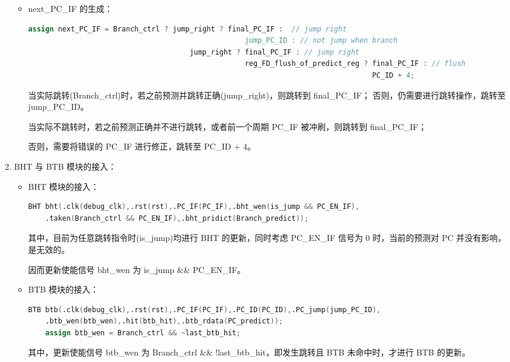 \documentclass{article}
\begin{document}
\begin{enumerate}
\begin{itemize}
        \item next\_PC\_IF 的生成：\par
        \begin{lstlisting}[language=Verilog]
    assign next_PC_IF = Branch_ctrl ? jump_right ? final_PC_IF :  // jump right
                                                   jump_PC_ID : // not jump when branch
                                      jump_right ? final_PC_IF : // jump right
                                                   reg_FD_flush_of_predict_reg ? final_PC_IF : // flush
                                                                                 PC_ID + 4;
        \end{lstlisting}
        当实际跳转(Branch\_ctrl)时，若之前预测并跳转正确(jump\_right)，则跳转到 final\_PC\_IF；
        否则，仍需要进行跳转操作，跳转至 jump\_PC\_ID。\par
        当实际不跳转时，若之前预测正确并不进行跳转，或者前一个周期 PC\_IF 被冲刷，则跳转到 final\_PC\_IF；\par
        否则，需要将错误的 PC\_IF 进行修正，跳转至 PC\_ID + 4。\par
    \end{itemize}

    \item BHT 与 BTB 模块的接入：\par
    \begin{itemize}
        \item BHT 模块的接入：\par
        \begin{lstlisting}[language=Verilog]
        BHT bht(.clk(debug_clk),.rst(rst),.PC_IF(PC_IF),.bht_wen(is_jump && PC_EN_IF),
    .taken(Branch_ctrl && PC_EN_IF),.bht_pridict(Branch_predict));
        \end{lstlisting}
        其中，目前为任意跳转指令时(is\_jump)均进行 BHT 的更新，同时考虑 PC\_EN\_IF 信号为 0 时，当前的预测对 PC 并没有影响，是无效的。\par
        因而更新使能信号 bht\_wen 为 is\_jump \&\& PC\_EN\_IF。\par

        \item BTB 模块的接入：\par
        \begin{lstlisting}[language=Verilog]
        BTB btb(.clk(debug_clk),.rst(rst),.PC_IF(PC_IF),.PC_ID(PC_ID),.PC_jump(jump_PC_ID),
    .btb_wen(btb_wen),.hit(btb_hit),.btb_rdata(PC_predict));
    assign btb_wen = Branch_ctrl && ~last_btb_hit;
        \end{lstlisting}
        其中，更新使能信号 btb\_wen 为 Branch\_ctrl \&\& !last\_btb\_hit，即发生跳转且 BTB 未命中时，才进行 BTB 的更新。\par
    \end{itemize}


\end{enumerate}
\end{document}
